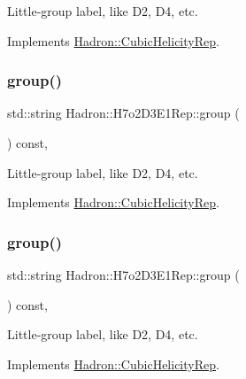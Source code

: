 Little-\/group label, like D2, D4, etc. 

Implements \mbox{\hyperlink{structHadron_1_1CubicHelicityRep_a101a7d76cd8ccdad0f272db44b766113}{Hadron\+::\+Cubic\+Helicity\+Rep}}.

\mbox{\label{structHadron_1_1H7o2D3E1Rep_a9a25c1c49d874a36ad6a3c82522d0482}} 
\subsubsection{\texorpdfstring{group()}{group()}\hspace{0.1cm}{\footnotesize\ttfamily [2/3]}}
{\footnotesize\ttfamily std\+::string Hadron\+::\+H7o2\+D3\+E1\+Rep\+::group (\begin{DoxyParamCaption}{ }\end{DoxyParamCaption}) const\hspace{0.3cm}{\ttfamily [inline]}, {\ttfamily [virtual]}}

Little-\/group label, like D2, D4, etc. 

Implements \mbox{\hyperlink{structHadron_1_1CubicHelicityRep_a101a7d76cd8ccdad0f272db44b766113}{Hadron\+::\+Cubic\+Helicity\+Rep}}.

\mbox{\label{structHadron_1_1H7o2D3E1Rep_a9a25c1c49d874a36ad6a3c82522d0482}} 
\subsubsection{\texorpdfstring{group()}{group()}\hspace{0.1cm}{\footnotesize\ttfamily [3/3]}}
{\footnotesize\ttfamily std\+::string Hadron\+::\+H7o2\+D3\+E1\+Rep\+::group (\begin{DoxyParamCaption}{ }\end{DoxyParamCaption}) const\hspace{0.3cm}{\ttfamily [inline]}, {\ttfamily [virtual]}}

Little-\/group label, like D2, D4, etc. 

Implements \mbox{\hyperlink{structHadron_1_1CubicHelicityRep_a101a7d76cd8ccdad0f272db44b766113}{Hadron\+::\+Cubic\+Helicity\+Rep}}.

